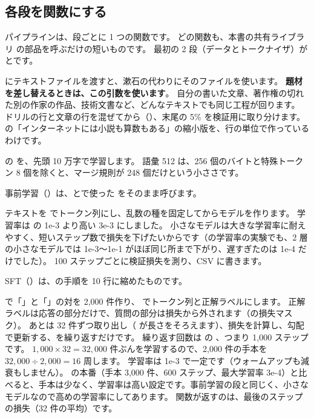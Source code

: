 \subsection*{各段を関数にする}

パイプラインは、段ごとに 1 つの関数です。
どの関数も、本書の共有ライブラリ  の部品を呼ぶだけの短いものです。
最初の 2 段（データとトークナイザ）がとです。


 にテキストファイルを渡すと、漱石の代わりにそのファイルを使います。
\textbf{題材を差し替えるときは、この引数を使います}。
自分の書いた文章、著作権の切れた別の作家の作品、技術文書など、どんなテキストでも同じ工程が回ります。
ドリルの行と文章の行を混ぜてから（）、末尾の 5\% を検証用に取り分けます。
の「インターネットには小説も算数もある」の縮小版を、行の単位で作っているわけです。


の  を、先頭 10 万字で学習します。
語彙 512 は、256 個のバイトと特殊トークン 8 個を除くと、マージ規則が 248 個だけという小ささです。

事前学習（）は、とで使った  をそのまま呼びます。


テキストを  でトークン列にし、乱数の種を固定してからモデルを作ります。
学習率は  の 1e-3 より高い 3e-3 にしました。
小さなモデルは大きな学習率に耐えやすく、短いステップ数で損失を下げたいからです（の学習率の実験でも、2 層の小さなモデルでは 1e-3〜1e-1 がほぼ同じ所まで下がり、遅すぎたのは 1e-4 だけでした）。
100 ステップごとに検証損失を測り、CSV に書きます。

SFT（）は、の手順を 10 行に縮めたものです。


 で「」と「」の対を 2,000 件作り、 でトークン列と正解ラベルにします。
正解ラベルは応答の部分だけで、質問の部分は損失から外されます（の損失マスク）。
あとは 32 件ずつ取り出し（ が長さをそろえます）、損失を計算し、勾配で更新する、を繰り返すだけです。
繰り返す回数は  の 、つまり 1,000 ステップです。
$1{,}000\times32=32{,}000$ 件ぶんを学習するので、2,000 件の手本を $32{,}000\div2{,}000=16$ 周します。
学習率は 1e-3 で一定です（ウォームアップも減衰もしません）。
の本番（手本 3,000 件、600 ステップ、最大学習率 3e-4）と比べると、手本は少なく、学習率は高い設定です。事前学習の段と同じく、小さなモデルなので高めの学習率にしてあります。
関数が返すのは、最後のステップの損失（32 件の平均）です。

